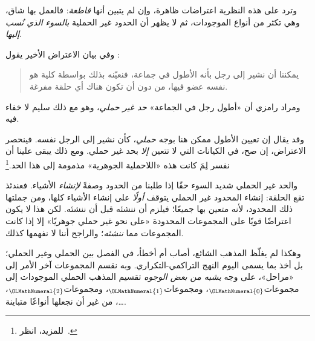 \documentclass[../../../include/open-logic-section]{subfiles}
\begin{document}
وترد على هذه النظرية اعتراضات ظاهرة، وإن لم يتبين أنها \emph{قاطعة}:
فالعمل بها شاق، وهي تكثر من أنواع الموجودات، ثم لا يظهر أن الحدود غير
الحملية \emph{بالسوء الذي نُسب إليها}.
	
وفي بيان الاعتراض الأخير يقول
\citeauthor{Ramsey1925}:
\begin{quote}
	يمكننا أن نشير إلى رجل بأنه الأطول في جماعة، فنعيّنه بذلك بواسطة
	كلية هو نفسه عضو فيها، من دون أن تكون هناك أي حلقة مفرغة.
	\citep{Ramsey1925}
\end{quote}
ومراد رامزي أن «أطول رجل في الجماعة» \emph{حد غير حملي}، وهو مع ذلك
سليم لا خفاء فيه.

وقد يقال إن تعيين الأطول ممكن هنا بوجه \emph{حملي}، كأن نشير إلى الرجل
نفسه. فينحصر الاعتراض، إن صح، في الكيانات التي لا تتعين \emph{إلا}
بحد غير حملي. ومع ذلك يبقى علينا أن نفسر لِمَ كانت هذه «اللاحملية
الجوهرية» مذمومة إلى هذا الحد.\footnote{للمزيد، انظر~\citet{Linnebo2010}.}

والحد غير الحملي شديد السوء حقًا إذا طلبنا من الحدود وصفةً
\emph{لإنشاء} الأشياء. فعندئذ تقع الحلقة: إنشاء المحدود غير الحملي
يتوقف \emph{أولًا} على إنشاء الأشياء كلها، ومن جملتها ذلك المحدود،
لأنه متعين بها جميعًا؛ فيلزم أن ننشئه قبل أن ننشئه. لكن هذا لا يكون
اعتراضًا قويًا على المجموعات المحدودة «على نحو غير حملي جوهريًا» إلا
إذا كانت المجموعات مما \emph{ننشئه}؛ والراجح أننا لا نفهمها كذلك.

وهكذا لم يغلّظ المذهب الشائع، أصاب أم أخطأ، في الفصل بين الحملي وغير
الحملي؛ بل أخذ بما يسمى اليوم النهج التراكمي-التكراري. وبه نقسم
المجموعات آخر الأمر إلى «مراحل»، على وجه \emph{يشبه من بعض الوجوه}
تقسيم المذهب الحملي الموجودات إلى مجموعات$_\OLMathNumeral{0}$، ومجموعات$_\OLMathNumeral{1}$،
ومجموعات$_\OLMathNumeral{2}$، \ldots، من غير أن نجعلها أنواعًا متباينة.
\end{document}
